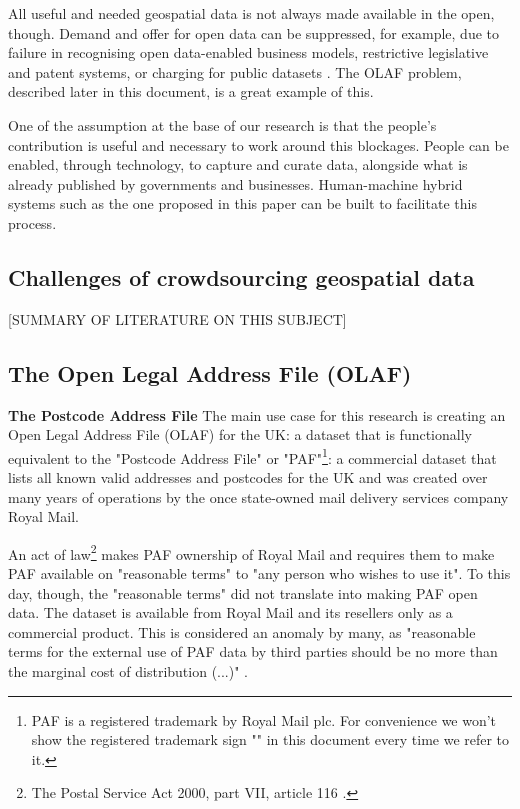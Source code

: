 All useful and needed geospatial data is not always made available in the open, though. Demand and offer for open data can be suppressed, for example, due to failure in recognising open data-enabled business models, restrictive legislative and patent systems, or charging for public datasets \cite{shadboltpaf}. The OLAF problem, described later in this document, is a great example of this.
	
One of the assumption at the base of our research is that the people's contribution is useful and necessary to work around this blockages. People can be enabled, through technology, to capture and curate data, alongside what is already published by governments and businesses. Human-machine hybrid systems such as the one proposed in this paper can be built to facilitate this process.

\subsection{Challenges of crowdsourcing geospatial data}

[SUMMARY OF LITERATURE ON THIS SUBJECT]

\subsection{The Open Legal Address File (OLAF)}
\label{subs:the-problem-of-creating-an-olaf}

\textbf{The Postcode Address File} The main use case for this research is creating an Open Legal Address File (OLAF) for the UK: a dataset that is functionally equivalent to the "Postcode Address File" or "PAF"\footnote{PAF is a registered trademark by Royal Mail plc. For convenience we won't show the registered trademark sign "\textregistered" in this document every time we refer to it.}: a commercial dataset that lists all known valid addresses and postcodes for the UK and was created over many years of operations by the once state-owned mail delivery services company Royal Mail.

An act of law\footnote{The Postal Service Act 2000, part VII, article 116 \cite{postalserviceact2000}.} makes PAF ownership of Royal Mail and requires them to make PAF available on "reasonable terms" to "any person who wishes to use it". To this day, though, the "reasonable terms" did not translate into making PAF open data. The dataset is available from Royal Mail and its resellers only as a commercial product. This is considered an anomaly by many, as "reasonable terms for the external use of PAF data by third parties should be no more than the marginal cost of distribution (...)" \cite{odugresponse}. 

